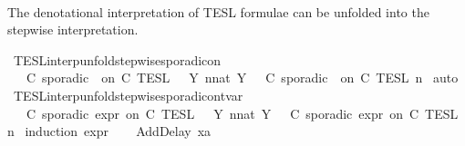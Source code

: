 \begin{isabellebody}
\ \ {\isacartoucheclose}%
\begin{isamarkuptext}%
The denotational interpretation of TESL formulae can be unfolded into the 
  stepwise interpretation.%
\end{isamarkuptext}\isamarkuptrue%
\isamarkupfalse%
\ TESL{\isacharunderscore}interp{\isacharunderscore}unfold{\isacharunderscore}stepwise{\isacharunderscore}sporadicon{\isacharcolon}\isanewline
\ \ {\isacartoucheopen}{\isasymlbrakk}\ C\ sporadic\ {\isasymtau}\ on\ C\ {\isasymrbrakk}\isactrlsub T\isactrlsub E\isactrlsub S\isactrlsub L\ {\isacharequal}\ {\isasymUnion}\ {\isacharbraceleft}Y{\isachardot}\ {\isasymexists}n{\isacharcolon}{\isacharcolon}nat{\isachardot}\ Y\ {\isacharequal}\ {\isasymlbrakk}\ C\ sporadic\ {\isasymtau}\ on\ C\ {\isasymrbrakk}\isactrlsub T\isactrlsub E\isactrlsub S\isactrlsub L\isactrlbsup {\isasymge}\ n\isactrlesup {\isacharbraceright}{\isacartoucheclose}\isanewline
%
\isadelimproof
%
\endisadelimproof
%
\isatagproof
{}\isamarkupfalse%
\ auto%
\endisatagproof
{\isafoldproof}%
%
\isadelimproof
\isanewline
%
\endisadelimproof
\isanewline
{}\isamarkupfalse%
\ TESL{\isacharunderscore}interp{\isacharunderscore}unfold{\isacharunderscore}stepwise{\isacharunderscore}sporadicon{\isacharunderscore}tvar{\isacharcolon}\isanewline
\ \ {\isacartoucheopen}{\isasymlbrakk}\ C\ sporadic{\isasymsharp}\ {\isasymtau}\isactrlsub e\isactrlsub x\isactrlsub p\isactrlsub r\ on\ C\ {\isasymrbrakk}\isactrlsub T\isactrlsub E\isactrlsub S\isactrlsub L\ {\isacharequal}\ {\isasymUnion}\ {\isacharbraceleft}Y{\isachardot}\ {\isasymexists}n{\isacharcolon}{\isacharcolon}nat{\isachardot}\ Y\ {\isacharequal}\ {\isasymlbrakk}\ C\ sporadic{\isasymsharp}\ {\isasymtau}\isactrlsub e\isactrlsub x\isactrlsub p\isactrlsub r\ on\ C\ {\isasymrbrakk}\isactrlsub T\isactrlsub E\isactrlsub S\isactrlsub L\isactrlbsup {\isasymge}\ n\isactrlesup {\isacharbraceright}{\isacartoucheclose}\isanewline
%
\isadelimproof
%
\endisadelimproof
%
\isatagproof
{}\isamarkupfalse%
\ {\isacharparenleft}induction\ {\isasymtau}\isactrlsub e\isactrlsub x\isactrlsub p\isactrlsub r{\isacharparenright}\isanewline
\ \ \isamarkupfalse%
\ {\isacharparenleft}AddDelay\ x{}a\ {\isasymtau}{\isacharparenright}\isanewline
\ \ \isamarkupfalse%
\ \isamarkupfalse%

\end{isabellebody}
